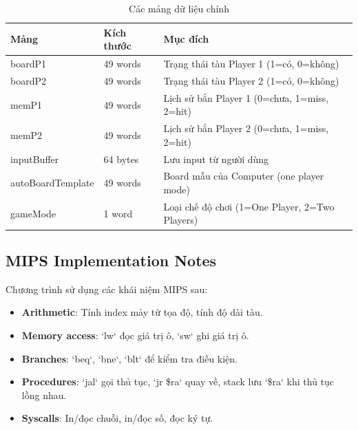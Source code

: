 \begin{table}[H]
\centering
\small
\begin{tabular}{|l|l|l|}
\hline
\textbf{Mảng} & \textbf{Kích thước} & \textbf{Mục đích} \\
\hline
boardP1 & 49 words & Trạng thái tàu Player 1 (1=có, 0=không) \\
\hline
boardP2 & 49 words & Trạng thái tàu Player 2 (1=có, 0=không) \\
\hline
memP1 & 49 words & Lịch sử bắn Player 1 (0=chưa, 1=miss, 2=hit) \\
\hline
memP2 & 49 words & Lịch sử bắn Player 2 (0=chưa, 1=miss, 2=hit) \\
\hline
inputBuffer & 64 bytes & Lưu input từ người dùng \\
\hline
autoBoardTemplate & 49 words & Board mẫu của Computer (one player mode) \\
\hline
gameMode & 1 word & Loại chế độ chơi (1=One Player, 2=Two Players) \\
\hline
\end{tabular}
\caption{Các mảng dữ liệu chính}
\end{table}

\subsection{MIPS Implementation Notes}

Chương trình sử dụng các khái niệm MIPS sau:

\begin{itemize}
    \item \textbf{Arithmetic}: Tính index mảy từ tọa độ, tính độ dài tàu.
    \item \textbf{Memory access}: `lw` đọc giá trị ô, `sw` ghi giá trị ô.
    \item \textbf{Branches}: `beq`, `bne`, `blt` để kiểm tra điều kiện.
    \item \textbf{Procedures}: `jal` gọi thủ tục, `jr \$ra` quay về, stack lưu `\$ra` khi thủ tục lồng nhau.
    \item \textbf{Syscalls}: In/đọc chuỗi, in/đọc số, đọc ký tự.
\end{itemize}
